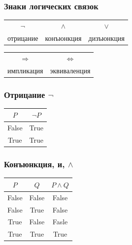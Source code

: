 \begin{frame}
	\frametitle{Знаки логических связок}
\Large
	\begin{center}
		\begin{table}
			\begin{tabular}{c  c  c}
				$¬$  &  $∧$ & $∨$ \\
				отрицание & конъюнкция & дизъюнкция\\
			\end{tabular}

			\begin{tabular}{c c}
				$\Rightarrow$ & $\Leftrightarrow$\\
				импликация & эквиваленция
			\end{tabular}
		\end{table}
	\end{center}
\end{frame}
\begin{frame}
	\Large
	\frametitle{Отрицание $¬$}
	\begin{center}
		\begin{tabular}{|c | c|}
		\hline
			\rowcolor{darkBlue}
		$P$ & $¬ P$ \\ \hline
		False & True \\ \hline
		True & True \\ \hline
	\end{tabular}
	\end{center}
\end{frame}

\begin{frame}
	\Large
	\frametitle{Конъюнкция, и, $∧$}
	\begin{center}
	\begin{table}
		\begin{tabular}{|c|c|c|}
			\hline
			\rowcolor{darkBlue}
			$P$ & 		$Q$ &		 $P ∧ Q$ \\ \hline
			False & 	False & 	False \\ \hline
			False & 	True & 		False \\ \hline
			True  & 	False & 	Fasle \\ \hline
			True & 		True & 		True \\ \hline
		\end{tabular}
	\end{table}
	\end{center}
\end{frame}

